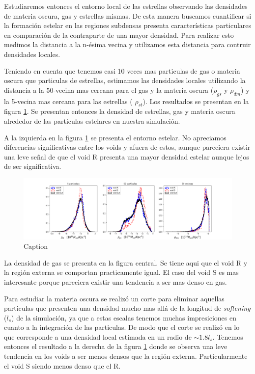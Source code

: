 Estudiaremos entonces el entorno local de las estrellas observando las densidades de materia oscura, gas y estrellas mismas. De esta manera buscamos cuantificar si la formaci\'on estelar en las regiones subdensas presenta caracter\'isticas particulares en comparaci\'on de la contraparte de una mayor densidad. 
 Para realizar esto medimos la distancia a la n-\'esima vecina y utilizamos esta distancia para contruir densidades locales. 

Teniendo en cuenta que tenemos casi 10 veces mas particulas de gas o materia oscura que particulas de estrellas, estimamos las densidades locales utilizando la distancia a la 50-vecina mas cercana para el gas y la materia oscura ($\rho_{gs}$ y $\rho_{dm}$) y la 5-vecina mas cercana para las estrellas ( $\rho_{st}$). Los resultados se presentan en la figura \ref{densidades locales}. Se presentan entonces la densidad de estrellas, gas y materia oscura alrededor de las particulas estelares en nuestra simulaci\'on. 

A la izquierda en la figura \ref{densidades locales} se presenta el entorno estelar. No apreciamos diferencias significativas entre los voids y afuera de estos, aunque pareciera existir una leve se\~nal de que el void R presenta una mayor densidad estelar aunque lejos de ser significativa. 

\begin{figure}
    \centering
    \includegraphics[width=\textwidth]{Figures/densidades_locales.png}
    \caption{Caption}
    \label{densidades locales}
\end{figure}{}

La densidad de gas se presenta en la figura central. Se tiene aqui que el void R y la regi\'on externa se comportan practicamente igual. El caso del void S es mas interesante porque pareciera existir una tendencia a ser mas denso en gas. 

Para estudiar la materia oscura se realiz\'o un corte para eliminar aquellas particulas que presenten una densidad mucho mas all\'a de la longitud de \textit{softening} ($l_{s}$) de la simulaci\'on, ya que a estas escalas tenemos muchas impresiciones en cuanto a la integraci\'on de las particulas. De modo que el corte se realiz\'o en lo que corresponde a una densidad local estimada en un radio de $\sim 1.8 l_{s}$. Tenemos entonces el resultado a la derecha de la figura \ref{densidades locales} donde se observa una leve tendencia en los voids a ser menos densos que la regi\'on externa. Particularmente el void S siendo menos denso que el R. 


